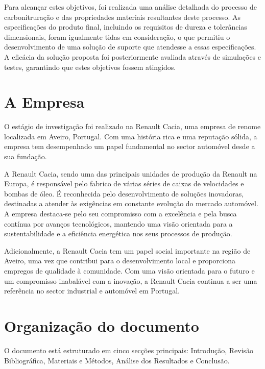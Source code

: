 Para alcançar estes objetivos, foi realizada uma análise detalhada do processo de carbonitruração e das propriedades materiais resultantes deste processo. As especificações do produto final, incluindo os requisitos de dureza e tolerâncias dimensionais, foram igualmente tidas em consideração, o que permitiu o desenvolvimento de uma solução de suporte que atendesse a essas especificações. A eficácia da solução proposta foi posteriormente avaliada através de simulações e testes, garantindo que estes objetivos fossem atingidos.

\section{A Empresa} \label{s:intro_empresa}
O estágio de investigação foi realizado na Renault Cacia, uma empresa de renome localizada em Aveiro, Portugal. Com uma história rica e uma reputação sólida, a empresa tem desempenhado um papel fundamental no sector automóvel desde a sua fundação.

A Renault Cacia, sendo uma das principais unidades de produção da Renault na Europa, é responsável pelo fabrico de várias séries de caixas de velocidades e bombas de óleo. É reconhecida pelo desenvolvimento de soluções inovadoras, destinadas a atender às exigências em constante evolução do mercado automóvel. A empresa destaca-se pelo seu compromisso com a excelência e pela busca contínua por avanços tecnológicos, mantendo uma visão orientada para a sustentabilidade e a eficiência energética nos seus processos de produção.

Adicionalmente, a Renault Cacia tem um papel social importante na região de Aveiro, uma vez que contribui para o desenvolvimento local e proporciona empregos de qualidade à comunidade. Com uma visão orientada para o futuro e um compromisso inabalável com a inovação, a Renault Cacia continua a ser uma referência no sector industrial e automóvel em Portugal.

\section{Organização do documento} \label{s:intro_organizacao}
O documento está estruturado em cinco secções principais: Introdução, Revisão Bibliográfica, Materiais e Métodos, Análise dos Resultados e Conclusão.

